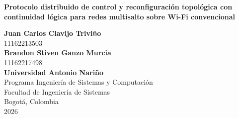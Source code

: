 \documentclass[12pt,oneside]{scrreprt}
\begin{document}
\pagestyle{empty}

\begin{titlepage}
\thispagestyle{headerimage}
\begin{center}

\vspace*{2\baselineskip} %

{\textbf{Protocolo distribuido de control y reconfiguración topológica con continuidad lógica para redes multisalto sobre Wi-Fi convencional}}

\vspace{6\baselineskip} %


\textbf{Juan Carlos Clavijo Triviño}\\
11162213503\\
\textbf{Brandon Stiven Ganzo Murcia}\\
11162217498\\

\vfill
\textbf{Universidad Antonio Nariño}\\
Programa Ingeniería de Sistemas y Computación\\
Facultad de Ingeniería de Sistemas\\
Bogotá, Colombia\\
2026

\end{center}
\end{titlepage}
\end{document}
